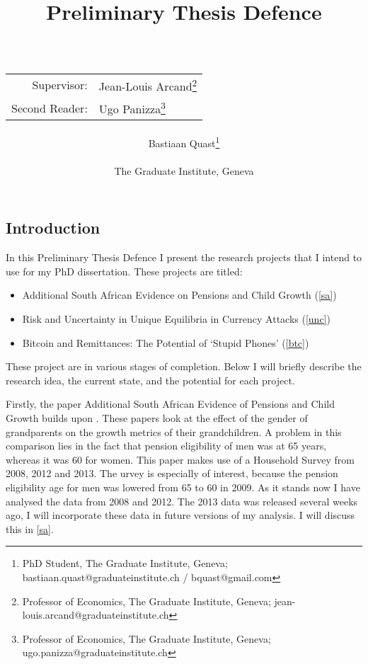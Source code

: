 \documentclass[a4paper]{report}
\title{Preliminary Thesis Defence\\~\\
\begin{tabular}{rl}
Supervisor:&Jean-Louis Arcand\footnote{Professor of Economics, The Graduate Institute, Geneva; jean-louis.arcand@graduateinstitute.ch}\\
Second Reader:&Ugo Panizza\footnote{Professor of Economics, The Graduate Institute, Geneva; ugo.panizza@graduateinstitute.ch}
\end{tabular}
}
\author{Bastiaan Quast\thanks{PhD Student, The Graduate Institute, Geneva; bastiaan.quast@graduateinstitute.ch / bquast@gmail.com}\\~\\
The Graduate Institute, Geneva}
\begin{document}
\maketitle
\tableofcontents

\begin{refsection}
\chapter{Introduction}
\label{intro}
In this Preliminary Thesis Defence I present the research projects that I intend to use for my PhD dissertation. These projects are titled:

\begin{itemize}
\item Additional South African Evidence on Pensions and Child Growth (\autoref{sa})
\item Risk and Uncertainty in Unique Equilibria in Currency Attacks (\autoref{unc})
\item Bitcoin and Remittances: The Potential of `Stupid Phones' (\autoref{btc})
\end{itemize}

These project are in various stages of completion.
Below I will briefly describe the research idea, the current state, and the potential for each project.

Firstly, the paper Additional South African Evidence of Pensions and Child Growth builds upon \textcite{duflo2000child, duflo2003grandmothers}.
These papers look at the effect of the gender of grandparents on the growth metrics of their grandchildren.
A problem in this comparison lies in the fact that pension eligibility of men was at 65 years, whereas it was 60 for women.
This paper makes use of a Household Survey from 2008, 2012 and 2013. The 
urvey is especially of interest, because the pension eligibility age for men was lowered from 65 to 60 in 2009.
As it stands now I have analysed the data from 2008 and 2012.
The 2013 data was released several weeks ago, I will incorporate these data in future versions of my analysis.
I will discuss this in \autoref{sa}.



\end{refsection}
\end{document}
